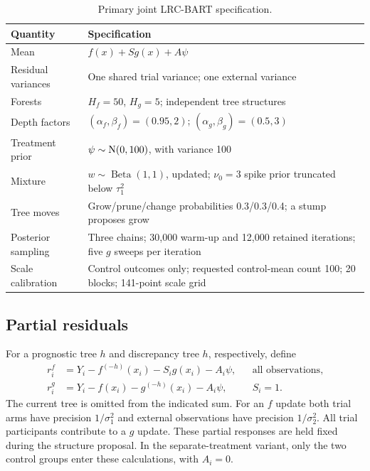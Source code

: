 \begin{table}[htbp]
\centering\small
\caption{Primary joint LRC-BART specification.}\label{tab:S1}
\begin{tabular}{p{2.0in}p{3.9in}}
\toprule
Quantity & Specification\\\midrule
Mean & $f(x)+Sg(x)+A\psi$\\
Residual variances & One shared trial variance; one external variance\\
Forests & $H_f=50$, $H_g=5$; independent tree structures\\
Depth factors & $(\alpha_f,\beta_f)=(0.95,2)$; $(\alpha_g,\beta_g)=(0.5,3)$\\
Treatment prior & $\psi\sim\mathrm{N}(0,100)$, with variance 100\\
Mixture & $w\sim\operatorname{Beta}(1,1)$, updated; $\nu_0=3$ spike prior truncated below $\tau_1^2$\\
Tree moves & Grow/prune/change probabilities 0.3/0.3/0.4; a stump proposes grow\\
Posterior sampling & Three chains; 30,000 warm-up and 12,000 retained iterations; five $g$ sweeps per iteration\\
Scale calibration & Control outcomes only; requested control-mean count 100; 20 blocks; 141-point scale grid\\
\bottomrule
\end{tabular}
\end{table}

\subsection{Partial residuals}\label{sec:A.2}
For a prognostic tree $h$ and discrepancy tree $h$, respectively, define
\begin{equation}\label{eq:partial}
\begin{aligned}
r_i^f&=Y_i-f^{(-h)}(x_i)-S_i g(x_i)-A_i\psi,&&\text{all observations},\\
r_i^g&=Y_i-f(x_i)-g^{(-h)}(x_i)-A_i\psi,&&S_i=1.
\end{aligned}
\end{equation}
The current tree is omitted from the indicated sum. For an $f$ update both trial arms have precision $1/\sigma_1^2$ and external observations have precision $1/\sigma_2^2$. All trial participants contribute to a $g$ update. These partial responses are held fixed during the structure proposal. In the separate-treatment variant, only the two control groups enter these calculations, with $A_i=0$.

